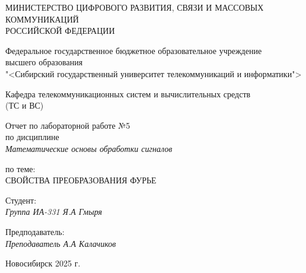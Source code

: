 \thispagestyle{empty}

\begin{center}
    МИНИСТЕРСТВО ЦИФРОВОГО РАЗВИТИЯ, СВЯЗИ И МАССОВЫХ КОММУНИКАЦИЙ \\ РОССИЙСКОЙ ФЕДЕРАЦИИ

    \vspace{20pt}

    Федеральное государственное бюджетное образовательное учреждение  \\  высшего образования \\
    "<Сибирский государственный университет телекоммуникаций и информатики"> \\

    \vspace{20pt}

    Кафедра телекоммуникационных систем и вычислительных средств \\  (ТС и ВС)
\end{center}

\vfill

\begin{center}
    Отчет по лабораторной работе №5 \\  
    по дисциплине \\
    \textit{Математические основы обработки сигналов}

    \vspace{20pt}

    по теме: \\
    \uppercase{Свойства преобразования Фурье}
\end{center}

\vfill

    \noindent Студент: \\
    \textit{Группа ИА-331 \hfill Я.А Гмыря}

    \vspace{20pt}

    \noindent Предподаватель: \\
    \textit{Преподаватель \hfill А.А Калачиков}

\vfill

\begin{center}
    Новосибирск 2025 г.
\end{center}